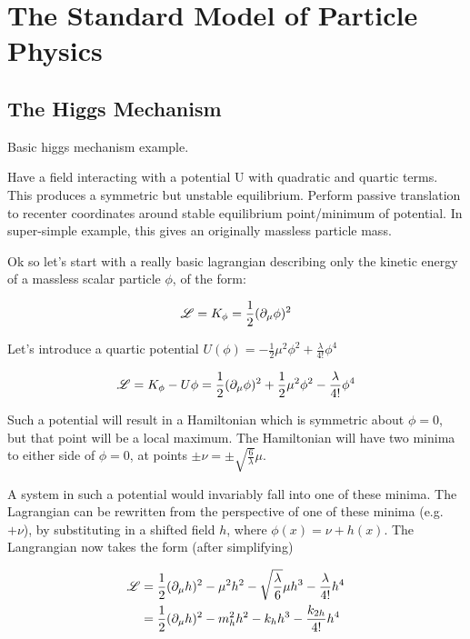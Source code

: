 \section{The Standard Model of Particle Physics}
    \subsection{The Higgs Mechanism}\label{sec:higgs_mechanism}

        Basic higgs mechanism example.

        Have a field interacting with a potential U with quadratic and quartic terms.
        This produces a symmetric but unstable equilibrium.
        Perform passive translation to recenter coordinates around stable equilibrium point/minimum of potential.
        In super-simple example, this gives an originally massless particle mass.

        Ok so let's start with a really basic lagrangian describing only the kinetic energy of a massless scalar particle $\phi$, of the form:

        \begin{equation}
            \mathscr{L} = K_{\phi} = \frac{1}{2} (\partial_{\mu} \phi)^2
        \end{equation}

        Let's introduce a quartic potential $U(\phi) = -\frac{1}{2} \mu^2 \phi^2 + \frac{\lambda}{4!} \phi^4$

        \begin{equation}
            \mathscr{L} = K_{\phi} - U{\phi} = \frac{1}{2} (\partial_{\mu} \phi)^2 
                +\frac{1}{2} \mu^2 \phi^2 - \frac{\lambda}{4!} \phi^4
        \end{equation}

        Such a potential will result in a Hamiltonian which is symmetric about $\phi=0$, but that point will be a local maximum.%
        The Hamiltonian will have two minima to either side of $\phi=0$, at points $\pm \nu = \pm \sqrt{\frac{6}{\lambda}} \mu$.

        A system in such a potential would invariably fall into one of these minima.
        The Lagrangian can be rewritten from the perspective of one of these minima (e.g.\ $+\nu$),
            by substituting in a shifted field $h$, where $\phi(x)=\nu+h(x)$.
        The Langrangian now takes the form (after simplifying)

        \begin{equation} \begin{split} \label{eq:basic_higgs}
            \mathscr{L} & = \frac{1}{2} (\partial_{\mu} h)^2
                - \mu^2 h^2
                -\sqrt{\frac{\lambda}{6}} \mu h^3
                - \frac{\lambda}{4!} h^4 \\
             & = \frac{1}{2} (\partial_{\mu} h)^2
                - m^2_{h} h^2
                - k_{h} h^3
                - \frac{k_{2h}}{4!} h^4
        \end{split} \end{equation} %

